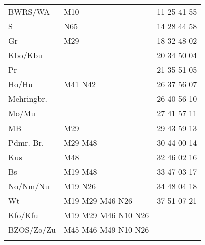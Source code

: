\begin{tabular}{!{\color{schiefergrau}\vrule width 3pt}*{3}{l!{\color{schiefergrau}\vrule width 3pt}}}
\hline
{}
 \\
\hline
BWRS/WA    & \mtram{} M10                                                      & 11 25 41 55 \\
S          & \nbus{} N65                                                       & 14 28 44 58 \\
Gr         & \mbus{} M29                                                       & 18 32 48 02 \\
Kbo/Kbu    & \nuacht{}                                                         & 20 34 50 04 \\
Pr         &                                                                   & 21 35 51 05 \\
Ho/Hu      & \mbus{} M41 \nbus{} N42                                           & 26 37 56 07 \\
Mehringbr. & \nusechs{}                                                        & 26 40 56 10 \\
Mo/Mu      &                                                                   & 27 41 57 11 \\
MB         & \mbus{} M29                                                       & 29 43 59 13 \\
Pdmr. Br.  & \nuzwei{} \mbus{} M29 M48                                         & 30 44 00 14 \\
Kus        & \nuzwei{} \mbus{} M48                                             & 32 46 02 16 \\
Bs         & \nuzwei{} \mbus{} M19 M48                                         & 33 47 03 17 \\
No/Nm/Nu   & \nuzwei{} \mbus{} M19 \nbus{} N26                                 & 34 48 04 18 \\
Wt         & \nuzwei{} \nudrei{} \mbus{} M19 M29 M46 \nbus{} N26               & 37 51 07 21 \\
Kfo/Kfu    & \nuzwei{} \nudrei{} \nuneun{} \mbus{} M19 M29 M46 \nbus{} N10 N26 & \\
BZOS/Zo/Zu & \nuzwei{} \nuneun{} \mbus{} M45 M46 M49 \nbus{} N10 N26           & \\
\myhline
\end{tabular}
%
